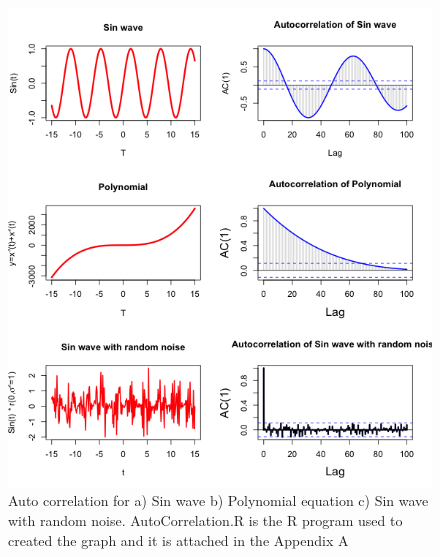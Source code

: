 \begin{figure}[!ht]
\centering
\includegraphics[scale=.65]{Images/ACExample}
\caption{Auto correlation for a) Sin wave b) Polynomial equation c) Sin wave with random noise. AutoCorrelation.R is the R program used to created the graph and it is attached in the Appendix A}
\label{fig:ACExample}
\end{figure}
